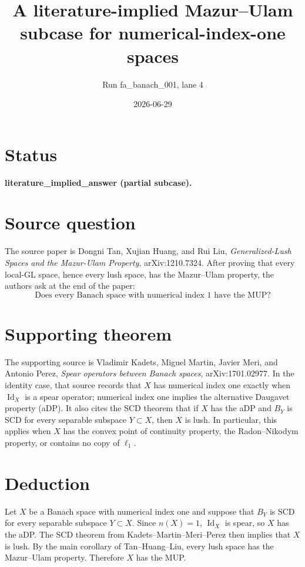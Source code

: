 \documentclass[11pt]{article}
\title{A literature-implied Mazur--Ulam subcase for numerical-index-one spaces}
\author{Run fa\_banach\_001, lane 4}
\date{2026-06-29}
\newcommand{\Id}{\operatorname{Id}}
\begin{document}
\maketitle

\section*{Status}

\textbf{literature\_implied\_answer (partial subcase).}

\section*{Source question}

The source paper is Dongni Tan, Xujian Huang, and Rui Liu,
\emph{Generalized-Lush Spaces and the Mazur-Ulam Property},
arXiv:1210.7324.  After proving that every local-GL space, hence every lush
space, has the Mazur--Ulam property, the authors ask at the end of the paper:
\[
\text{Does every Banach space with numerical index }1\text{ have the MUP?}
\]

\section*{Supporting theorem}

The supporting source is Vladimir Kadets, Miguel Martin, Javier Meri, and
Antonio Perez, \emph{Spear operators between Banach spaces},
arXiv:1701.02977.  In the identity case, that source records that \(X\) has
numerical index one exactly when \(\Id_X\) is a spear operator; numerical
index one implies the alternative Daugavet property (aDP).  It also cites the
SCD theorem that if \(X\) has the aDP and \(B_Y\) is SCD for every separable
subspace \(Y\subset X\), then \(X\) is lush.  In particular, this applies when
\(X\) has the convex point of continuity property, the Radon--Nikodym
property, or contains no copy of \(\ell_1\).

\section*{Deduction}

Let \(X\) be a Banach space with numerical index one and suppose that
\(B_Y\) is SCD for every separable subspace \(Y\subset X\).  Since \(n(X)=1\),
\(\Id_X\) is spear, so \(X\) has the aDP.  The SCD theorem from
Kadets--Martin--Meri--Perez then implies that \(X\) is lush.  By the main
corollary of Tan--Huang--Liu, every lush space has the Mazur--Ulam property.
Therefore \(X\) has the MUP.
\end{document}
